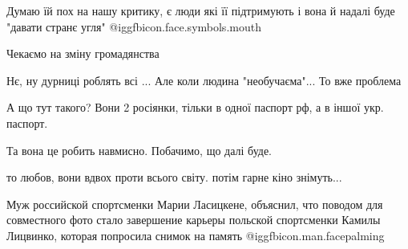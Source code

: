 \begin{itemize}
Думаю їй пох на нашу критику, є люди які її підтримують і вона й надалі буде "давати странє угля"  @igg{fbicon.face.symbols.mouth} 

 
Чекаємо на зміну громадянства

 
Нє, ну дурниці роблять всі ...
Але коли людина "необучаєма"... То вже проблема

 
А що тут такого? Вони 2 росіянки, тільки в одної паспорт рф, а в іншої укр. паспорт.

 
Та вона це робить навмисно. Побачимо, що далі буде.

 
то любов, вони вдвох проти всього світу. потім гарне кіно знімуть...

 

Муж российской спортсменки Марии Ласицкене, объяснил, что поводом для
совместного фото стало завершение карьеры польской спортсменки Камилы Лицвинко,
которая попросила снимок на память  @igg{fbicon.man.facepalming} 



\end{itemize}
